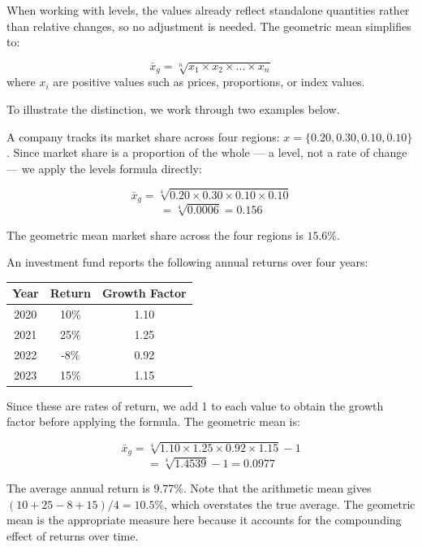 \documentclass[
  11pt,
  letterpaper,
  DIV=11,
  numbers=noendperiod,
  oneside,
  open=any]{scrreprt}
\begin{document}
When working with levels, the values already reflect standalone
quantities rather than relative changes, so no adjustment is needed. The
geometric mean simplifies to:

\begin{bsformula}

\[\bar{x}_g=\sqrt[n]{x_1 \times x_2 \times ... \times x_n}\] where
\(x_i\) are positive values such as prices, proportions, or index
values.

\end{bsformula}

To illustrate the distinction, we work through two examples below.

\begin{bsexample}[Example 1]

A company tracks its market share across four regions:
\(x=\{0.20, 0.30, 0.10, 0.10\}\). Since market share is a proportion of
the whole --- a level, not a rate of change --- we apply the levels
formula directly:

\[\bar{x}_g=\sqrt[4]{0.20 \times 0.30 \times 0.10 \times 0.10}\]
\[=\sqrt[4]{0.0006}=0.156\]

The geometric mean market share across the four regions is \(15.6\%\).

\end{bsexample}

\begin{bsexample}[Example 2]

An investment fund reports the following annual returns over four years:

\begin{center}
\begin{tabular}{ccc}
\toprule
Year & Return & Growth Factor \\
\midrule
2020 & 10\% & 1.10 \\
2021 & 25\% & 1.25 \\
2022 & -8\% & 0.92 \\
2023 & 15\% & 1.15 \\
\bottomrule
\end{tabular}
\end{center}

Since these are rates of return, we add 1 to each value to obtain the
growth factor before applying the formula. The geometric mean is:

\[\bar{x}_g = \sqrt[4]{1.10 \times 1.25 \times 0.92 \times 1.15}-1\]
\[= \sqrt[4]{1.4539}-1 = 0.0977\]

The average annual return is \(9.77\%\). Note that the arithmetic mean
gives \((10 + 25 - 8 + 15)/4 = 10.5\%\), which overstates the true
average. The geometric mean is the appropriate measure here because it
accounts for the compounding effect of returns over time.

\end{bsexample}
\end{document}
